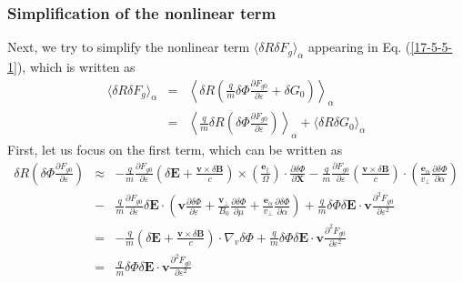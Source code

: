 \documentclass{llncs}
\newcommand{\tmmathbf}[1]{\ensuremath{\boldsymbol{#1}}}
\begin{document}
\subsubsection{Simplification of the nonlinear term}

Next, we try to simplify the nonlinear term $\langle \delta R \delta F_g
\rangle_{\alpha}$ appearing in Eq. (\ref{17-5-5-1}), which is written as
\begin{eqnarray}
  \langle \delta R \delta F_g \rangle_{\alpha} & = & \left\langle \delta R
  \left( \frac{q}{m} \delta \Phi \frac{\partial F_{g 0}}{\partial \varepsilon}
  + \delta G_0 \right) \right\rangle_{\alpha} \nonumber\\
  & = & \left\langle \frac{q}{m} \delta R \left( \delta \Phi \frac{\partial
  F_{g 0}}{\partial \varepsilon} \right) \right\rangle_{\alpha} + \langle
  \delta R \delta G_0 \rangle_{\alpha} 
\end{eqnarray}
First, let us focus on the first term, which can be written as
\begin{eqnarray}
  \delta R \left( \delta \Phi \frac{\partial F_{g 0}}{\partial \varepsilon}
  \right) & \approx & - \frac{q}{m} \frac{\partial F_{g 0}}{\partial
  \varepsilon} \left( \delta \mathbf{E}+ \frac{\mathbf{v} \times \delta
  \mathbf{B}}{c} \right) \times \left( \frac{\tmmathbf{e}_{\parallel}}{\Omega}
  \right) \cdot \frac{\partial \delta \Phi}{\partial \mathbf{X}} -
  \frac{q}{m} \frac{\partial F_{g 0}}{\partial \varepsilon} \left(
  \frac{\mathbf{v} \times \delta \mathbf{B}}{c} \right) \cdot \left(
  \frac{\tmmathbf{e}_{\alpha}}{v_{\perp}}  \frac{\partial \delta
  \Phi}{\partial \alpha} \right) \nonumber\\
  & - & \frac{q}{m}  \frac{\partial F_{g 0}}{\partial \varepsilon} \delta
  \mathbf{E} \cdot \left( \mathbf{v} \frac{\partial \delta \Phi}{\partial
  \varepsilon} + \frac{\mathbf{v}_{\perp}}{B_0}  \frac{\partial \delta
  \Phi}{\partial \mu} + \frac{\tmmathbf{e}_{\alpha}}{v_{\perp}} 
  \frac{\partial \delta \Phi}{\partial \alpha} \right) + \frac{q}{m} \delta
  \Phi \delta \mathbf{E} \cdot \mathbf{v} \frac{\partial^2 F_{g 0}}{\partial
  \varepsilon^2} \nonumber\\
  & = & - \frac{q}{m} \left( \delta \mathbf{E}+ \frac{\mathbf{v} \times
  \delta \mathbf{B}}{c} \right) \cdot \nabla_v \delta \Phi + \frac{q}{m}
  \delta \Phi \delta \mathbf{E} \cdot \mathbf{v} \frac{\partial^2 F_{g
  0}}{\partial \varepsilon^2} \nonumber\\
  & = & \frac{q}{m} \delta \Phi \delta \mathbf{E} \cdot \mathbf{v}
  \frac{\partial^2 F_{g 0}}{\partial \varepsilon^2} 
\end{eqnarray}
\end{document}

